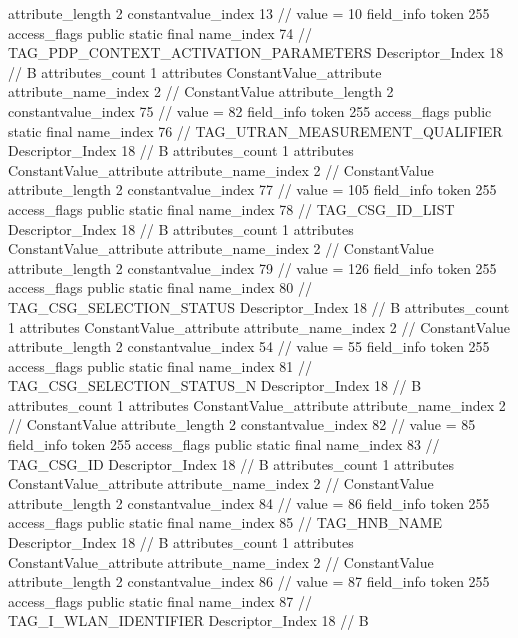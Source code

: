 {{{{{{{					attribute_length	2
					constantvalue_index	13		// value = 10
				}
				}
			}
			field_info {
				token	255
				access_flags	public static final
				name_index	74		// TAG_PDP_CONTEXT_ACTIVATION_PARAMETERS
				Descriptor_Index	18		// B
				attributes_count	1
				attributes {
				ConstantValue_attribute {
					attribute_name_index	2		// ConstantValue
					attribute_length	2
					constantvalue_index	75		// value = 82
				}
				}
			}
			field_info {
				token	255
				access_flags	public static final
				name_index	76		// TAG_UTRAN_MEASUREMENT_QUALIFIER
				Descriptor_Index	18		// B
				attributes_count	1
				attributes {
				ConstantValue_attribute {
					attribute_name_index	2		// ConstantValue
					attribute_length	2
					constantvalue_index	77		// value = 105
				}
				}
			}
			field_info {
				token	255
				access_flags	public static final
				name_index	78		// TAG_CSG_ID_LIST
				Descriptor_Index	18		// B
				attributes_count	1
				attributes {
				ConstantValue_attribute {
					attribute_name_index	2		// ConstantValue
					attribute_length	2
					constantvalue_index	79		// value = 126
				}
				}
			}
			field_info {
				token	255
				access_flags	public static final
				name_index	80		// TAG_CSG_SELECTION_STATUS
				Descriptor_Index	18		// B
				attributes_count	1
				attributes {
				ConstantValue_attribute {
					attribute_name_index	2		// ConstantValue
					attribute_length	2
					constantvalue_index	54		// value = 55
				}
				}
			}
			field_info {
				token	255
				access_flags	public static final
				name_index	81		// TAG_CSG_SELECTION_STATUS_N
				Descriptor_Index	18		// B
				attributes_count	1
				attributes {
				ConstantValue_attribute {
					attribute_name_index	2		// ConstantValue
					attribute_length	2
					constantvalue_index	82		// value = 85
				}
				}
			}
			field_info {
				token	255
				access_flags	public static final
				name_index	83		// TAG_CSG_ID
				Descriptor_Index	18		// B
				attributes_count	1
				attributes {
				ConstantValue_attribute {
					attribute_name_index	2		// ConstantValue
					attribute_length	2
					constantvalue_index	84		// value = 86
				}
				}
			}
			field_info {
				token	255
				access_flags	public static final
				name_index	85		// TAG_HNB_NAME
				Descriptor_Index	18		// B
				attributes_count	1
				attributes {
				ConstantValue_attribute {
					attribute_name_index	2		// ConstantValue
					attribute_length	2
					constantvalue_index	86		// value = 87
				}
				}
			}
			field_info {
				token	255
				access_flags	public static final
				name_index	87		// TAG_I_WLAN_IDENTIFIER
				Descriptor_Index	18		// B
}}}}}
